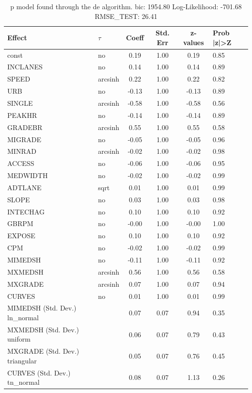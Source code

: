 \begin{table}
	\caption{p model found through the de algorithm. bic: 1954.80 Log-Likelihood: -701.68 RMSE_TEST: 26.41}
	\begin{center}
		\begin{tabular}{|l|l|c|c|c|l|}
			\hline
			Effect & $\tau$ & Coeff & Std. Err & z-values & Prob |z|>Z \\
			\hline
			const & no & 0.19 & 1.00 & 0.19 & 0.85 \\
			\hline
			INCLANES & no & 0.14 & 1.00 & 0.14 & 0.89 \\
			\hline
			SPEED & arcsinh & 0.22 & 1.00 & 0.22 & 0.82 \\
			\hline
			URB & no & -0.13 & 1.00 & -0.13 & 0.89 \\
			\hline
			SINGLE & arcsinh & -0.58 & 1.00 & -0.58 & 0.56 \\
			\hline
			PEAKHR & no & -0.14 & 1.00 & -0.14 & 0.89 \\
			\hline
			GRADEBR & arcsinh & 0.55 & 1.00 & 0.55 & 0.58 \\
			\hline
			MIGRADE & no & -0.05 & 1.00 & -0.05 & 0.96 \\
			\hline
			MINRAD & arcsinh & -0.02 & 1.00 & -0.02 & 0.98 \\
			\hline
			ACCESS & no & -0.06 & 1.00 & -0.06 & 0.95 \\
			\hline
			MEDWIDTH & no & -0.02 & 1.00 & -0.02 & 0.99 \\
			\hline
			ADTLANE & sqrt & 0.01 & 1.00 & 0.01 & 0.99 \\
			\hline
			SLOPE & no & 0.03 & 1.00 & 0.03 & 0.98 \\
			\hline
			INTECHAG & no & 0.10 & 1.00 & 0.10 & 0.92 \\
			\hline
			GBRPM & no & -0.00 & 1.00 & -0.00 & 1.00 \\
			\hline
			EXPOSE & no & 0.10 & 1.00 & 0.10 & 0.92 \\
			\hline
			CPM & no & -0.02 & 1.00 & -0.02 & 0.99 \\
			\hline
			MIMEDSH & no & -0.11 & 1.00 & -0.11 & 0.92 \\
			\hline
			MXMEDSH & arcsinh & 0.56 & 1.00 & 0.56 & 0.58 \\
			\hline
			MXGRADE & arcsinh & 0.07 & 1.00 & 0.07 & 0.94 \\
			\hline
			CURVES & no & 0.01 & 1.00 & 0.01 & 0.99 \\
			\hline
			MIMEDSH (Std. Dev.) ln_normal &  & 0.07 & 0.07 & 0.94 & 0.35 \\
			\hline
			MXMEDSH (Std. Dev.) uniform &  & 0.06 & 0.07 & 0.79 & 0.43 \\
			\hline
			MXGRADE (Std. Dev.) triangular &  & 0.05 & 0.07 & 0.76 & 0.45 \\
			\hline
			CURVES (Std. Dev.) tn_normal &  & 0.08 & 0.07 & 1.13 & 0.26 \\
			\hline
		\end{tabular}
	\end{center}
\end{table}